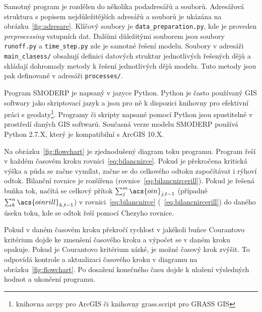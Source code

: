 Samotný program je rozdělen do několika podadresářů a souborů. Adresářová struktura s popisem nejdůležitějších adresářů a souborů je ukázána na obrázku~\ref{fig:adresare}. Klíčový soubory je {\tt data\_preparation.py}, kde je proveden {\it preprocessing} vstupních dat. Dalšími důležitými souborem jsou soubory {\tt runoff.py} a {\tt time\_step.py} zde je samotné řešení modelu. Soubory v adresáři {\tt main\_clasess/} obsahují definici datových struktur jednotlivých řešených dějů a skládají dohromady metody k řešení jednotlivých dějů modelu. Tuto metody jsou pak definované v adresáři {\tt processes/}. 

Program SMODERP je napsaný v jazyce Python. Python je často používaný GIS softwary jako skriptovací jazyk a jsou pro ně k dispozici knihovny pro efektivní práci s geodaty\footnote{knihovna arcpy pro ArcGIS či knihovny grass.script pro GRASS GIS}. Programy či skripty napsané pomocí Python jsou spustitelné v prostředí daných GIS softwarů. Současná verze modelu SMODERP používá Python 2.7.X, který je kompatibilní s ArcGIS 10.X.

Na obrázku~\ref{fig:flowchart} je zjednodušený diagram toku programu. Program řeší v každém časovém kroku rovnici~\ref{eq:bilancnirce}. Pokud je překročena kritická výška a půda se začne vymílat, začne se do celkového  odtoku  započítávat i rýhoví odtok. Bilanční rovnice je rozšířena (rovnice~\ref{eq:bilancnircerill}). Pokud je řešená buňka tok, načítá se celkový přítok $\sum_j^m \acs{oin}_{j,t-1}$ (případně $\sum_k^n \acs{oinrill}_{k,t-1}$) v rovnici~\ref{eq:bilancnirce} (~\ref{eq:bilancnircerill}) do daného úseku toku, kde se odtok řeší pomocí Chezyho rovnice.

Pokud v daném časovém kroku překročí rychlost v jakékoli buňce Courantovo kritérium dojde ke zmenšení časového kroku a výpočet se v daném kroku opakuje. Pokud je Courantovo kritérium nízké, je možné časový krok zvýšit. To odpovídá kontrole a aktualizaci časového kroku v diagramu na obrázku~\ref{fig:flowchart}. Po dosažení konečného času dojde k uložení výsledných hodnot a ukončení programu.






% 
% 

